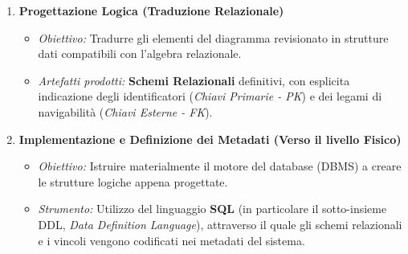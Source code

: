 \begin{enumerate}
    \item \textbf{Progettazione Logica (Traduzione Relazionale)}
    \begin{itemize}
        \item \textit{Obiettivo:} Tradurre gli elementi del diagramma revisionato in strutture dati compatibili con l'algebra relazionale.
        \item \textit{Artefatti prodotti:} \textbf{Schemi Relazionali} definitivi, con esplicita indicazione degli identificatori (\textit{Chiavi Primarie - PK}) e dei legami di navigabilità (\textit{Chiavi Esterne - FK}).
    \end{itemize}
    
    \item \textbf{Implementazione e Definizione dei Metadati (Verso il livello Fisico)}
    \begin{itemize}
        \item \textit{Obiettivo:} Istruire materialmente il motore del database (DBMS) a creare le strutture logiche appena progettate.
        \item \textit{Strumento:} Utilizzo del linguaggio \textbf{SQL} (in particolare il sotto-insieme DDL, \textit{Data Definition Language}), attraverso il quale gli schemi relazionali e i vincoli vengono codificati nei metadati del sistema.
    \end{itemize}
\end{enumerate}











